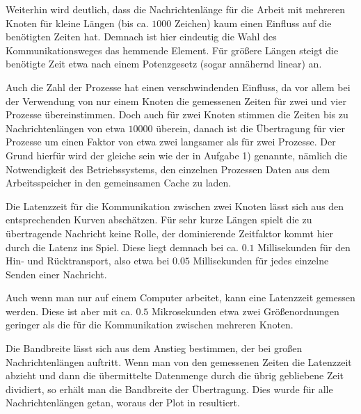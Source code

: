 Weiterhin wird deutlich, dass die Nachrichtenlänge für die Arbeit mit mehreren
Knoten für kleine Längen (bis ca. $1000$ Zeichen) kaum einen Einfluss auf die
benötigten Zeiten hat. Demnach ist hier eindeutig die Wahl des Kommunikationsweges
das hemmende Element. Für größere Längen steigt die benötigte Zeit etwa nach einem 
Potenzgesetz (sogar annähernd linear) an. 

Auch die Zahl der Prozesse hat einen verschwindenden Einfluss, da vor allem bei der
Verwendung von nur einem Knoten die gemessenen Zeiten für zwei und vier Prozesse
übereinstimmen. Doch auch für zwei Knoten stimmen die Zeiten bis zu Nachrichtenlängen 
von etwa $10000$ überein, danach ist die Übertragung für vier Prozesse um einen Faktor
von etwa zwei langsamer als für zwei Prozesse. Der Grund hierfür wird der gleiche
sein wie der in Aufgabe 1) genannte, nämlich die Notwendigkeit des Betriebssystems,
den einzelnen Prozessen Daten aus dem Arbeitsspeicher in den gemeinsamen Cache zu laden.

Die Latenzzeit für die Kommunikation zwischen zwei Knoten lässt sich aus den entsprechenden
Kurven abschätzen. Für sehr kurze Längen spielt die zu übertragende Nachricht keine Rolle,
der dominierende Zeitfaktor kommt hier durch die Latenz ins Spiel. Diese liegt demnach bei
ca. $0.1$ Millisekunden für den Hin- und Rücktransport, also etwa bei $0.05$ Millisekunden
für jedes einzelne Senden einer Nachricht.

Auch wenn man nur auf einem Computer arbeitet, kann eine Latenzzeit gemessen werden.
Diese ist aber mit ca. $0.5$ Mikrosekunden etwa zwei Größenordnungen geringer als die
für die Kommunikation zwischen mehreren Knoten.

Die Bandbreite lässt sich aus dem Anstieg bestimmen, der bei großen Nachrichtenlängen
auftritt. Wenn man von den gemessenen Zeiten die Latenzzeit abzieht und dann die
übermittelte Datenmenge durch die übrig gebliebene Zeit dividiert, so erhält man 
die Bandbreite der Übertragung. Dies wurde für alle Nachrichtenlängen getan, woraus
der Plot in  resultiert.

